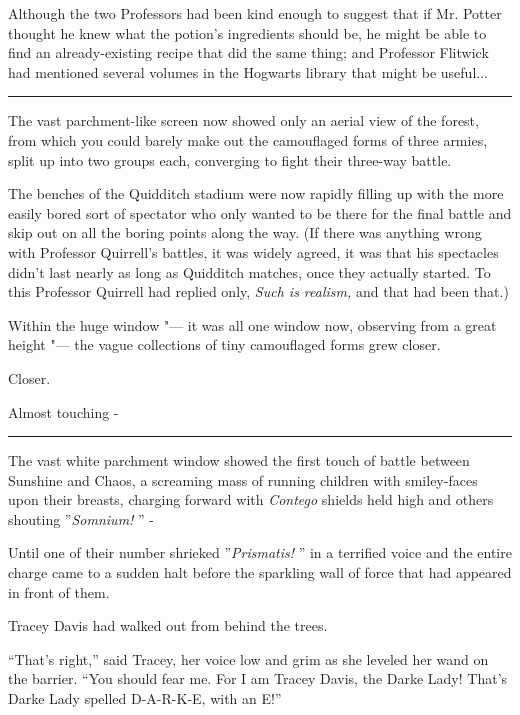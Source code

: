 Although the two Professors had been kind enough to suggest that if Mr.
Potter thought he knew what the potion's ingredients should be, he might
be able to find an already-existing recipe that did the same thing; and
Professor Flitwick had mentioned several volumes in the Hogwarts library
that might be useful...

\begin{center}\rule{3in}{0.4pt}\end{center}

The vast parchment-like screen now showed only an aerial view of the
forest, from which you could barely make out the camouflaged forms of
three armies, split up into two groups each, converging to fight their
three-way battle.

The benches of the Quidditch stadium were now rapidly filling up with
the more easily bored sort of spectator who only wanted to be there for
the final battle and skip out on all the boring points along the way.
(If there was anything wrong with Professor Quirrell's battles, it was
widely agreed, it was that his spectacles didn't last nearly as long as
Quidditch matches, once they actually started. To this Professor
Quirrell had replied only, \emph{Such is realism,} and that had been
that.)

Within the huge window "--- it was all one window now, observing from a
great height "--- the vague collections of tiny camouflaged forms grew
closer.

Closer.

Almost touching -

\begin{center}\rule{3in}{0.4pt}\end{center}

The vast white parchment window showed the first touch of battle between
Sunshine and Chaos, a screaming mass of running children with
smiley-faces upon their breasts, charging forward with \emph{Contego}
shields held high and others shouting ''\emph{Somnium!} '' -

Until one of their number shrieked ''\emph{Prismatis!} '' in a terrified
voice and the entire charge came to a sudden halt before the sparkling
wall of force that had appeared in front of them.

Tracey Davis had walked out from behind the trees.

``That's right,'' said Tracey, her voice low and grim as she leveled her
wand on the barrier. ``You should fear me. For I am Tracey Davis, the
Darke Lady! That's Darke Lady spelled D-A-R-K-E, with an E!''

